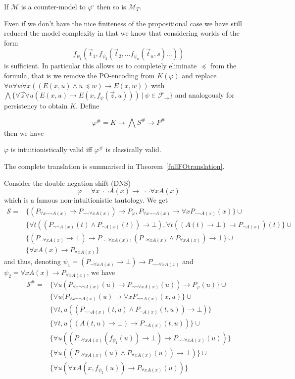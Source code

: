 \documentclass[a4paper,UKenglish,cleveref, autoref, thm-restate]{lipics-v2021}
\begin{document}
\begin{corollary}
	If $\mathcal M$ is a counter-model to $\varphi^\circ$ then so is $\mathcal M_T$.
\end{corollary}

Even if we don't have the nice finiteness of the propositional case we have still reduced the model complexity in that we know that considering worlds of the form $$f_{\psi_1}(\vec t_1, f_{\psi_2}(\vec t_2, \dots f_{\psi_n}(\vec t_n, s)\dots))$$ is sufficient. In particular this allows us to completely eliminate $\preceq$ from the formula, that is we remove the PO-encoding from $K(\varphi)$ and replace $\forall u\forall w\forall x((E(x, u)\wedge u\preceq w)\to E(x, w))$ with $\bigwedge\{\forall \vec z\forall u(E(x, u)\to E(x, f_\psi(\vec z, u)))\:|\:\psi\in\mathcal F_\to\}$ and analogously for persistency to obtain $K$. Define

$$\varphi^{\#} = K\to \bigwedge S^\#\to P^\#$$
then we have 
\begin{theorem}
	$\varphi$ is intuitionistically valid iff $\varphi^\#$ is classically valid.
\end{theorem}
The complete translation is summarised in Theorem~\ref{fullFOtranslation}.

\begin{example}
	Consider the double negation shift (DNS)
	$$\varphi = \forall x\neg\neg A(x)\to \neg\neg\forall x A(x)$$
	which is a famous non-intuitionistic tautology. We get
	\begin{align*}
		\mathcal S = & \{(P_{\forall x\neg\neg A(x)}\to P_{\neg\neg\forall xA(x)})\to P_\varphi, P_{\forall x\neg\neg A(x)}\to \forall xP_{\neg\neg A(x)}(x)\}\cup\\
		& \{\forall t((P_{\neg\neg A(x)}(t)\wedge P_{\neg A(x)}(t))\to \bot), \forall t((A(t)\to \bot)\to P_{\neg A(x)})(t)\}\cup\\
		& \{(P_{\neg\forall xA(x)}\to \bot)\to P_{\neg\neg\forall xA(x)}, (P_{\neg\forall xA(x)}\wedge P_{\forall xA(x)})\to \bot\}\cup\\
		&\{\forall xA(x)\to P_{\forall xA(x)}\}
	\end{align*}
	and thus, denoting $\psi_1 = (P_{\neg\forall xA(x)}\to \bot)\to P_{\neg\neg\forall xA(x)}$ and $\psi_2 = \forall xA(x)\to P_{\forall xA(x)}$, we have
	\begin{align*}
		\mathcal S^\# = & \{\forall u(P_{\forall x\neg\neg A(x)}(u)\to P_{\neg\neg\forall xA(x)}(u))\to P_\varphi(u)\}\cup\\& \{\forall u(P_{\forall x\neg\neg A(x)}(u)\to \forall xP_{\neg\neg A(x)}(x, u)\}\cup\\
		& \{\forall t, u((P_{\neg\neg A(x)}(t, u)\wedge P_{\neg A(x)}(t, u))\to \bot)\}\\& \{\forall t, u((A(t, u)\to \bot)\to P_{\neg A(x)}(t, u))\}\cup\\
		& \{\forall u((P_{\neg\forall xA(x)}(f_{\psi_1}(u))\to \bot)\to P_{\neg\neg\forall xA(x)}(u))\}\\& \{\forall u((P_{\neg\forall xA(x)}(u)\wedge P_{\forall xA(x)}(u))\to \bot)\}\cup\\
		&\{\forall u(\forall xA(x, f_{\psi_2}(u))\to P_{\forall xA(x)}(u))\}
	\end{align*}
\end{example}
\end{document}
